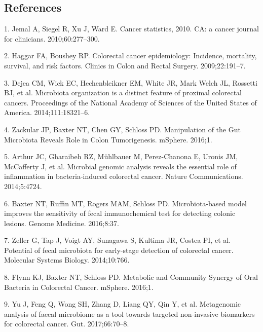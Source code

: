 \documentclass[12pt,]{article}
\begin{document}
\newpage

\subsection*{References}\label{references}

\hypertarget{refs}{}
\hypertarget{ref-jemal_cancer_2010}{}
1. Jemal A, Siegel R, Xu J, Ward E. Cancer statistics, 2010. CA: a
cancer journal for clinicians. 2010;60:277--300.

\hypertarget{ref-haggar_colorectal_2009}{}
2. Haggar FA, Boushey RP. Colorectal cancer epidemiology: Incidence,
mortality, survival, and risk factors. Clinics in Colon and Rectal
Surgery. 2009;22:191--7.

\hypertarget{ref-dejea_microbiota_2014}{}
3. Dejea CM, Wick EC, Hechenbleikner EM, White JR, Mark Welch JL,
Rossetti BJ, et al. Microbiota organization is a distinct feature of
proximal colorectal cancers. Proceedings of the National Academy of
Sciences of the United States of America. 2014;111:18321--6.

\hypertarget{ref-zackular_manipulation_2016}{}
4. Zackular JP, Baxter NT, Chen GY, Schloss PD. Manipulation of the Gut
Microbiota Reveals Role in Colon Tumorigenesis. mSphere. 2016;1.

\hypertarget{ref-arthur_microbial_2014}{}
5. Arthur JC, Gharaibeh RZ, Mühlbauer M, Perez-Chanona E, Uronis JM,
McCafferty J, et al. Microbial genomic analysis reveals the essential
role of inflammation in bacteria-induced colorectal cancer. Nature
Communications. 2014;5:4724.

\hypertarget{ref-baxter_microbiota-based_2016}{}
6. Baxter NT, Ruffin MT, Rogers MAM, Schloss PD. Microbiota-based model
improves the sensitivity of fecal immunochemical test for detecting
colonic lesions. Genome Medicine. 2016;8:37.

\hypertarget{ref-zeller_potential_2014}{}
7. Zeller G, Tap J, Voigt AY, Sunagawa S, Kultima JR, Costea PI, et al.
Potential of fecal microbiota for early-stage detection of colorectal
cancer. Molecular Systems Biology. 2014;10:766.

\hypertarget{ref-flynn_metabolic_2016}{}
8. Flynn KJ, Baxter NT, Schloss PD. Metabolic and Community Synergy of
Oral Bacteria in Colorectal Cancer. mSphere. 2016;1.

\hypertarget{ref-yu_metagenomic_2017}{}
9. Yu J, Feng Q, Wong SH, Zhang D, Liang QY, Qin Y, et al. Metagenomic
analysis of faecal microbiome as a tool towards targeted non-invasive
biomarkers for colorectal cancer. Gut. 2017;66:70--8.
\end{document}
